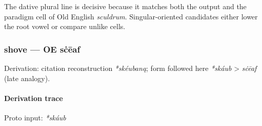 \documentclass[
  british,
  a4paper,
]{article}
\begin{document}
The dative plural line is decisive because it matches both the output
and the paradigm cell of Old English \emph{sculdrum}. Singular-oriented
candidates either lower the root vowel or compare unlike cells.

\subsubsection{shove --- OE sċēaf}\label{shove-oe-sux10bux113af}

Derivation: citation reconstruction \emph{*skéubaną}; form followed here
\emph{*skáub} \textgreater{} \emph{sċēaf} (late analogy).

\paragraph{Derivation trace}\label{derivation-trace-54}

Proto input: \emph{*skáub}

\begingroup
\setlength{\fboxsep}{6pt}

\noindent{} \endgroup
\end{document}
